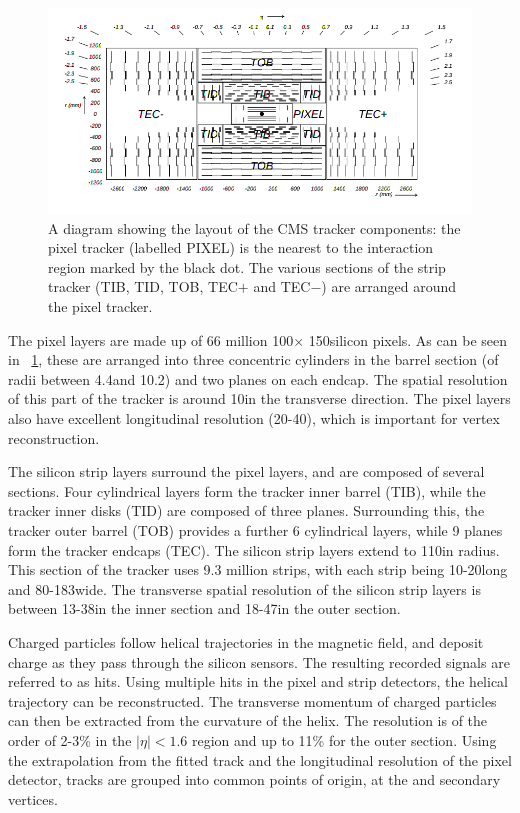 \begin{figure}[h]
\centering
\includegraphics[width=1.0\textwidth]{detectorFigures/trackerSchematic.png}
\caption{A diagram showing the layout of the CMS tracker components: the pixel tracker (labelled PIXEL) is the nearest to the interaction region marked by the black dot. The various sections of the strip tracker (TIB, TID, TOB, TEC$+$ and TEC$-$) are arranged around the pixel tracker. \cite{CMSTDR}}
\label{fig:trk}
\end{figure}

The pixel layers are made up of 66 million 100\um $\times$ 150\um silicon pixels. As can be seen in \Fig~\ref{fig:trk}, these are arranged into three concentric cylinders in the barrel section (of radii between 4.4\cm and 10.2\cm) and two planes on each endcap. The spatial resolution of this part of the tracker is around 10\um in the transverse direction. The pixel layers also have excellent longitudinal resolution (20-40\um), which is important for vertex reconstruction.~\cite{trackerperformance2014}

The silicon strip layers surround the pixel layers, and are composed of several sections. Four cylindrical layers form the tracker inner barrel (TIB), while the tracker inner disks (TID) are composed of three planes. Surrounding this, the tracker outer barrel (TOB) provides a further 6 cylindrical layers, while 9 planes form the tracker endcaps (TEC). The silicon strip layers extend to 110\cm in radius. This section of the tracker uses 9.3 million strips, with each strip being 10-20\cm long and 80-183\um wide. The transverse spatial resolution of the silicon strip layers is between 13-38\um in the inner section and 18-47\um in the outer section.~\cite{trackerperformance2014}

Charged particles follow helical trajectories in the \CMS magnetic field, and deposit charge as they pass through the silicon sensors. The resulting recorded signals are referred to as hits. Using multiple hits in the pixel and strip detectors, the helical trajectory can be reconstructed. The transverse momentum \pT of charged particles can then be extracted from the curvature of the helix. The \pT resolution is of the order of 2-3\% in the $|\eta|<1.6$ region and up to 11\% for the outer section. Using the extrapolation from the fitted track and the longitudinal resolution of the pixel detector, tracks are grouped into common points of origin, at the \PV and secondary vertices. 

